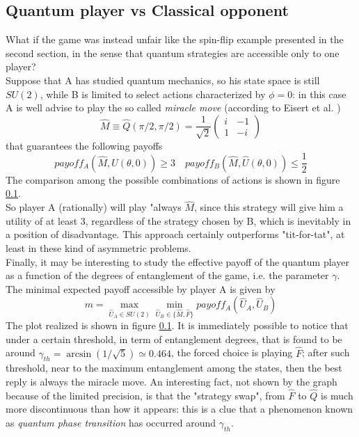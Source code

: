 \subsection{Quantum player vs Classical opponent}
What if the game was instead unfair like the spin-flip example presented in the second section, in the sense that quantum strategies are accessible only to one player?\\
Suppose that A has studied quantum mechanics, so his state space is still $SU(2)$, while B is limited to select actions characterized by $\phi=0$: in this case A is well advise to play the so called \textit{miracle move} (according to Eisert et al. \cite{Eisert_1999})
\[ \hat{M}\equiv\hat{Q}(\pi/2,\pi/2)=\frac{1}{\sqrt{2}}\begin{pmatrix} i&-1\\1&-i \end{pmatrix}  \]
that guarantees the following payoffs
\[ payoff_A\left(\hat{M},\hat{U}(\theta,0)\right) \geq 3 \quad payoff_B\left(\hat{M},\hat{U}(\theta,0)\right) \leq \frac{1}{2}  \]
The comparison among the possible combinations of actions is shown in figure \ref{}.\\
So player A (rationally) will play "always $\hat{M}$, since this strategy will give him a utility of at least 3, regardless of the strategy chosen by B, which is inevitably in a position of disadvantage. This approach certainly outperforms "tit-for-tat", at least in these kind of asymmetric problems.\\
Finally, it may be interesting to study the effective payoff of the quantum player as a function of the degrees of entanglement of the game, i.e. the parameter $\gamma$. The minimal expected payoff accessible by player A is given by
\[ m = \max_{\hat{U}_A\in SU(2)}\min_{\hat{U}_B\in\{\hat{M},\hat{F}\}} payoff_A\left(\hat{U}_A, \hat{U}_B\right) \]
The plot realized is shown in figure \ref{}. It is immediately possible to notice that under a certain threshold, in term of entanglement degrees, that is found to be around $\gamma_{th} = \arcsin\left(1/\sqrt{5}\right)\simeq 0.464$, the forced choice is playing $\hat{F}$; after such threshold, near to the maximum entanglement among the states, then the best reply is always the miracle move. An interesting fact, not shown by the graph because of the limited precision, is that the "strategy swap", from $\hat{F}$ to $\hat{Q}$ is much more discontinuous than how it appears: this is a clue that a phenomenon known as \textit{quantum phase transition} has occurred around $\gamma_{th}$.	





